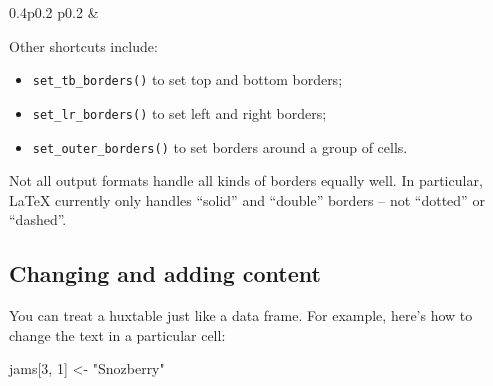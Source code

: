 \documentclass[
]{article}
\newenvironment{Shaded}{\begin{snugshade}}{\end{snugshade}}
\newcommand{\DecValTok}[1]{\textcolor[rgb]{0.00,0.00,0.81}{#1}}
\newcommand{\NormalTok}[1]{#1}
\newcommand{\OtherTok}[1]{\textcolor[rgb]{0.56,0.35,0.01}{#1}}
\newcommand{\StringTok}[1]{\textcolor[rgb]{0.31,0.60,0.02}{#1}}
\providecommand{\tightlist}{%
  \setlength{\itemsep}{0pt}\setlength{\parskip}{0pt}}
\begin{document}
\begin{table}[ht]
\begin{centerbox}
\begin{threeparttable}
\begin{tabularx}{0.4\textwidth}{p{} p{}}
 &
 \tabularnewline[-0.5pt]


\end{tabularx}
\end{threeparttable}\par\end{centerbox}

\end{table}
 

\FloatBarrier

Other shortcuts include:

\begin{itemize}
\tightlist
\item
  \texttt{set\_tb\_borders()} to set top and bottom borders;
\item
  \texttt{set\_lr\_borders()} to set left and right borders;
\item
  \texttt{set\_outer\_borders()} to set borders around a group of cells.
\end{itemize}

Not all output formats handle all kinds of borders equally well. In
particular, LaTeX currently only handles ``solid'' and ``double''
borders -- not ``dotted'' or ``dashed''.

\hypertarget{changing-and-adding-content}{%
\subsection{Changing and adding
content}\label{changing-and-adding-content}}

You can treat a huxtable just like a data frame. For example, here's how
to change the text in a particular cell:

\begin{Shaded}
\begin{Highlighting}[]
\NormalTok{jams[}\DecValTok{3}\NormalTok{, }\DecValTok{1}\NormalTok{] }\OtherTok{\textless{}{-}} \StringTok{"Snozberry"}
\end{Highlighting}
\end{Shaded}
\end{document}

